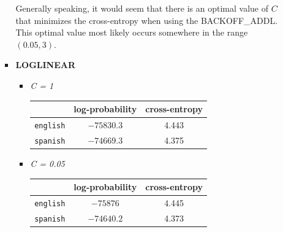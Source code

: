 \documentclass[11pt]{article}
\begin{document}
\begin{enumerate}
\begin{enumerate}[label=(\alph*)]
\begin{itemize}
\begin{itemize}
\begin{center}
\begin{tabular}{| r || c | c |}
				\end{tabular}\end{center}

			\end{itemize} \vspace{8pt}

			Generally speaking, it would seem that there is an optimal value of $C$ that minimizes the cross-entropy when using the BACKOFF\_ADDL. This optimal value most likely occurs somewhere in the range $(0.05, 3)$.
			\vspace{8pt} \\

		\newpage
		\item[] \hspace{-24pt} \textbf{LOGLINEAR}

			\begin{itemize}
			\item[] \hspace{-24pt} \textit{C = 1} 	 \vspace{4pt}
				\begin{center}\begin{tabular}{| r || c | c |}
				\hline
									& log-probability	& cross-entropy \\
				\hline \hline
				\texttt{english}	& $-75830.3$		& 4.443			\\
				\texttt{spanish}	& $-74669.3$		& 4.375			\\
				\hline
				
				\end{tabular}\end{center}
				
			\item[] \hspace{-24pt} \textit{C = 0.05} \vspace{4pt}
				\begin{center}\begin{tabular}{| r || c | c |}
				\hline
									& log-probability	& cross-entropy \\
				\hline \hline
				\texttt{english}	& $-75876$			& 4.445			\\
				\texttt{spanish}	& $-74640.2$		& 4.373			\\
				\hline
				
				\end{tabular}\end{center}


\end{itemize}
\end{itemize}
\end{enumerate}
\end{enumerate}
\end{document}
